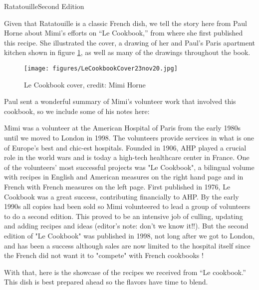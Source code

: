 \begin{entry}{Ratatouille}{Second Edition}
\label{sec:lecookbook}

\begin{open}
Given that Ratatouille is a classic French dish, we tell the story here from Paul Horne about Mimi's efforts on ``Le Cookbook,'' from where she first published this recipe. She illustrated the cover, a drawing of her and Paul's Paris apartment kitchen shown in figure \ref{fig:lecookbook}, as well as many of the drawings throughout the book.

\begin{figure}
  \centering
  \texttt{[image: figures/LeCookbookCover23nov20.jpg]}
  \caption{Le Cookbook cover, credit: Mimi Horne}
  \label{fig:lecookbook}
\end{figure}

Paul sent a wonderful summary of Mimi's volunteer work that involved this cookbook, so we include some of his notes here:

Mimi was a volunteer at the American Hospital of Paris from the early 1980s until we moved to London in 1998. The volunteers
provide services in what is one of Europe's best and chic-est hospitals. Founded in 1906, AHP played a crucial role in the world wars and is today a high-tech healthcare center in France. One of the volunteers' most successful projects was "Le Cookbook", a bilingual volume with recipes in English and American measures on the right hand page and in French with French measures on the left page. First published in 1976, Le Cookbook was a great success, contributing financially to AHP. By the early 1990s all copies had been sold so Mimi volunteered to lead a group of volunteers to do a second edition. This proved to be an intensive job of culling, updating and adding recipes and ideas (editor's note: don't we know it!!). But the second edition of "Le Cookbook" was published in 1998, not long after we got to London, and has been a success although sales are now limited to the hospital itself since the French did not want it to "compete" with French cookbooks !

With that, here is the showcase of the recipes we received from ``Le cookbook.'' This dish is best prepared ahead so the flavors have time to blend.


\end{open}
\end{entry}
